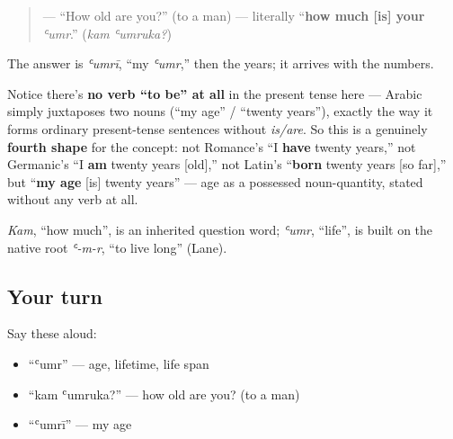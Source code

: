 \begin{grammarlens}[title={Grammar Lens: \ar{كم} \ar{عمرك؟} — no verb needed}]
\begin{quote}
\textbf{ } — \textquotedblleft{}How old are you?\textquotedblright{} (to a man) — literally \textquotedblleft{}\textbf{how much {[}is{]} your} \emph{ʿumr}.\textquotedblright{} (\emph{kam ʿumruka?})
\end{quote}

The answer is \emph{ʿumrī}, \textquotedblleft{}my \emph{ʿumr},\textquotedblright{} then the years; it arrives with the numbers.

Notice there's \textbf{no verb \textquotedblleft{}to be\textquotedblright{} at all} in the present tense here — Arabic simply juxtaposes two nouns (\textquotedblleft{}my age\textquotedblright{} / \textquotedblleft{}twenty years\textquotedblright{}), exactly the way it forms ordinary present-tense sentences without \emph{is/are}. So this is a genuinely \textbf{fourth shape} for the concept: not Romance's \textquotedblleft{}I \textbf{have} twenty years,\textquotedblright{} not Germanic's \textquotedblleft{}I \textbf{am} twenty years {[}old{]},\textquotedblright{} not Latin's \textquotedblleft{}\textbf{born} twenty years {[}so far{]},\textquotedblright{} but \textquotedblleft{}\textbf{my age} {[}is{]} twenty years\textquotedblright{} — age as a possessed noun-quantity, stated without any verb at all.
\end{grammarlens}

\begin{cousinweb}
\emph{Kam}, \textquotedblleft{}how much\textquotedblright{}, is an inherited question word; \emph{ʿumr}, \textquotedblleft{}life\textquotedblright{}, is built on the native root \emph{ʿ-m-r}, \textquotedblleft{}to live long\textquotedblright{} (Lane).
\end{cousinweb}

\subsection*{Your turn}
Say these aloud:

\begin{itemize}
\raggedright
  \item \textquotedblleft{}ʿumr\textquotedblright{} — age, lifetime, life span
  \item \textquotedblleft{}kam ʿumruka?\textquotedblright{} — how old are you? (to a man)
  \item \textquotedblleft{}ʿumrī\textquotedblright{} — my age
\end{itemize}

